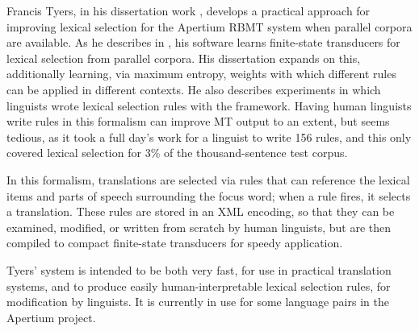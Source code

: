 Francis Tyers, in his dissertation work \cite{tyers-dissertation}, develops a
practical approach for improving lexical selection for the Apertium RBMT
system when parallel corpora are available.
As he describes in \cite{tyers-fst}, his software learns finite-state
transducers for lexical selection from parallel corpora.
His dissertation expands on this, additionally learning, via maximum entropy,
weights with which different rules can be applied in different contexts.
He also describes experiments in which linguists wrote lexical selection rules
with the framework. Having human linguists write rules in this formalism can
improve MT output to an extent, but seems tedious, as it took a full day's work
for a linguist to write 156 rules, and this only covered lexical selection for
3\% of the thousand-sentence test corpus.

In this formalism, translations are selected via rules that can reference the
lexical items and parts of speech surrounding the focus word; when a rule
fires, it selects a translation. These rules are stored in an XML encoding, so
that they can be examined, modified, or written from scratch by human
linguists, but are then compiled to compact finite-state transducers for speedy
application.

Tyers' system is intended to be both very fast, for use in practical
translation systems, and to produce easily human-interpretable lexical
selection rules, for modification by linguists. It is currently in use for
some language pairs in the Apertium project.

